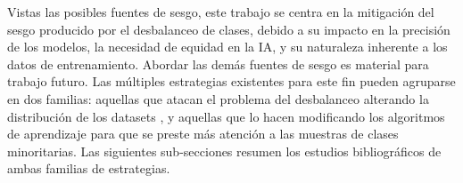 Vistas las posibles fuentes de sesgo, este trabajo se centra en la mitigación del sesgo producido por el desbalanceo de clases, debido a su impacto en la precisión de los modelos, la necesidad de equidad en la IA, y su naturaleza inherente a los datos de entrenamiento. Abordar las demás fuentes de sesgo es material para trabajo futuro. Las múltiples estrategias existentes para este fin pueden agruparse en dos familias: aquellas que atacan el problema del desbalanceo alterando la distribución de los datasets \cite{nafi2020addressing}, y aquellas que lo hacen modificando los algoritmos de aprendizaje \cite{lin2017focal,khan2017cost,narayanan2020transfer,rahimzadeh2020modified} para que se preste más atención a las muestras de clases minoritarias. Las siguientes sub-secciones resumen los estudios bibliográficos de ambas familias de estrategias.